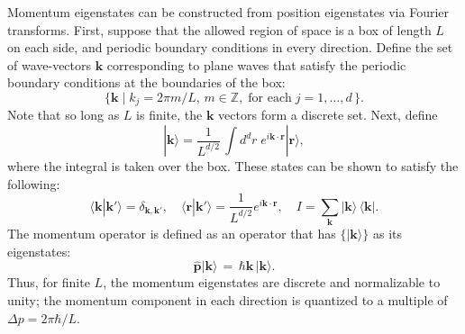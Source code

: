 \documentclass[pra,12pt]{revtex4}
\begin{document}
Momentum eigenstates can be constructed from position eigenstates via
Fourier transforms.  First, suppose that the allowed region of space
is a box of length $L$ on each side, and periodic boundary conditions
in every direction.  Define the set of wave-vectors $\mathbf{k}$
corresponding to plane waves that satisfy the periodic boundary
conditions at the boundaries of the box:
\begin{equation*}
  \Big\{\mathbf{k}  \; \Big| \; k_j = 2\pi m/L, \,m\in\mathbb{Z}, \;\text{for each} \; j = 1, \dots,d\, \Big\}.
\end{equation*}
Note that so long as $L$ is finite, the $\mathbf{k}$ vectors form a
discrete set.  Next, define
\begin{equation}
  |\mathbf{k}\rangle = \frac{1}{L^{d/2}} \, \int d^dr \; e^{i\mathbf{k}\cdot\mathbf{r}} |\mathbf{r}\rangle,
\end{equation}
where the integral is taken over the box.  These states
can be shown to satisfy the following:
\begin{equation}
  \langle\mathbf{k}|\mathbf{k}'\rangle = \delta_{\mathbf{k},\mathbf{k}'}, \quad \langle\mathbf{r}|\mathbf{k}'\rangle = \frac{1}{L^{d/2}} e^{i\mathbf{k}\cdot\mathbf{r}}, \quad I = \sum_{\mathbf{k}} |\mathbf{k}\rangle\,\langle\mathbf{k}|.
\end{equation}
The momentum operator is defined as an operator that has
$\{|\mathbf{k}\rangle\}$ as its eigenstates:
\begin{equation}
  \hat{\mathbf{p}} |\mathbf{k}\rangle \,=\, \hbar \mathbf{k}\, |\mathbf{k}\rangle.
\end{equation}
Thus, for finite $L$, the momentum eigenstates are discrete and
normalizable to unity; the momentum component in each direction is
quantized to a multiple of $\Delta p = 2\pi\hbar/L$.
\end{document}
